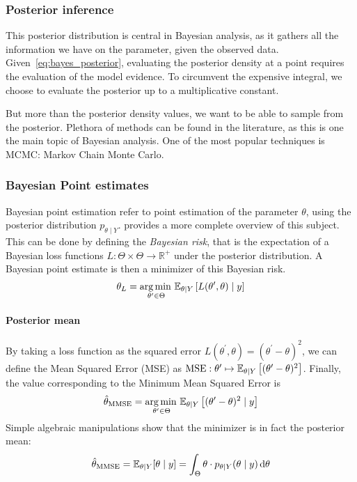 \documentclass[../../Main_ManuscritThese.tex]{subfiles}
\begin{document}
\subsubsection{Posterior inference}
\label{sec:posterior_inference}
This posterior distribution is central in Bayesian analysis, as it gathers all the information we have on the parameter, given the observed data. Given~\eqref{eq:bayes_posterior}, evaluating the posterior density at a point requires the evaluation of the model evidence. To circumvent the expensive integral, we choose to evaluate the posterior up to a multiplicative constant.

But more than the posterior density values, we want to be able to sample from the posterior. Plethora of methods can be found in the literature, as this is one the main topic of Bayesian analysis. One of the most popular techniques is MCMC: Markov Chain Monte Carlo.


\subsubsection{Bayesian Point estimates}
\label{sec:bayes_point_estimates}
Bayesian point estimation refer to point estimation of the parameter $\theta$, using the posterior distribution $p_{\theta \mid Y}$.\cite{lehmann_theory_2006} provides a more complete overview of this subject.
This can be done by defining the \emph{Bayesian risk}, that is the expectation of a Bayesian loss functions $L: \Theta \times \Theta \rightarrow \mathbb{R}^+$ under the posterior distribution. A Bayesian point estimate is then a minimizer of this Bayesian risk.
\begin{equation}
  \theta_{L} = \operatorname*{arg\,min \,}_{\theta^{\prime} \in \Theta} \mathbb{E}_{\theta\mid Y}\left[L(\theta^{\prime}, \theta) \mid y\right]
\end{equation}

\paragraph{Posterior mean}
By taking a loss function as the squared error $L(\theta^{\prime}, \theta) = (\theta^{\prime} - \theta)^2$, we can define the Mean Squared Error (MSE) as $\mathrm{MSE}: \theta^{\prime}\mapsto\mathbb{E}_{\theta\mid Y}\left[(\theta^{\prime} - \theta)^2\right]$. Finally, the value corresponding to the Minimum Mean Squared Error is
\begin{equation}
  \hat{\theta}_{\mathrm{MMSE}} = \operatorname*{arg\,min \,}_{\theta^{\prime}\in\Theta}\mathbb{E}_{\theta\mid Y}\left[(\theta^{\prime} - \theta)^2 \mid  y\right]
\end{equation}
Simple algebraic manipulations show that the minimizer is in fact the posterior mean:
\begin{equation}
  \label{eq:def_MMSE}
  \hat{\theta}_{\mathrm{MMSE}} = \mathbb{E}_{\theta\mid Y}[\theta \mid  y] = \int_{\Theta}\theta\cdot p_{\theta\mid Y}(\theta \mid  y)\,\mathrm{d}\theta
\end{equation}
\end{document}

